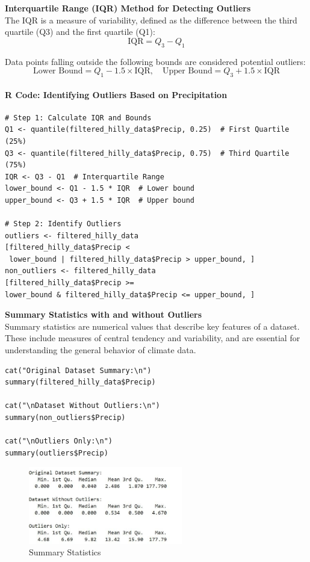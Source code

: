 \textbf{Interquartile Range (IQR) Method for Detecting Outliers}\\

The IQR is a measure of variability, defined as the difference between the third quartile (Q3) and the first quartile (Q1):
\[
\text{IQR} = Q_3 - Q_1
\]

Data points falling outside the following bounds are considered potential outliers:
\[
\text{Lower Bound} = Q_1 - 1.5 \times \text{IQR}, \quad \text{Upper Bound} = Q_3 + 1.5 \times \text{IQR}
\]

\paragraph{R Code: Identifying Outliers Based on Precipitation}

\begin{verbatim}
# Step 1: Calculate IQR and Bounds
Q1 <- quantile(filtered_hilly_data$Precip, 0.25)  # First Quartile (25%)
Q3 <- quantile(filtered_hilly_data$Precip, 0.75)  # Third Quartile (75%)
IQR <- Q3 - Q1  # Interquartile Range
lower_bound <- Q1 - 1.5 * IQR  # Lower bound
upper_bound <- Q3 + 1.5 * IQR  # Upper bound

# Step 2: Identify Outliers
outliers <- filtered_hilly_data
[filtered_hilly_data$Precip <
 lower_bound | filtered_hilly_data$Precip > upper_bound, ]
non_outliers <- filtered_hilly_data
[filtered_hilly_data$Precip >= 
lower_bound & filtered_hilly_data$Precip <= upper_bound, ]
\end{verbatim}

\textbf{Summary Statistics with and without Outliers} \\

Summary statistics are numerical values that describe key features of a dataset. These include measures of central tendency and variability, and are essential for understanding the general behavior of climate data.

\begin{verbatim}
cat("Original Dataset Summary:\n")
summary(filtered_hilly_data$Precip)

cat("\nDataset Without Outliers:\n")
summary(non_outliers$Precip)

cat("\nOutliers Only:\n")
summary(outliers$Precip)
\end{verbatim}

\begin{figure}[h]
\centering
\includegraphics[width=0.6\textwidth]{figures/summary_stats.jpg}
\caption{Summary Statistics}
\end{figure}

